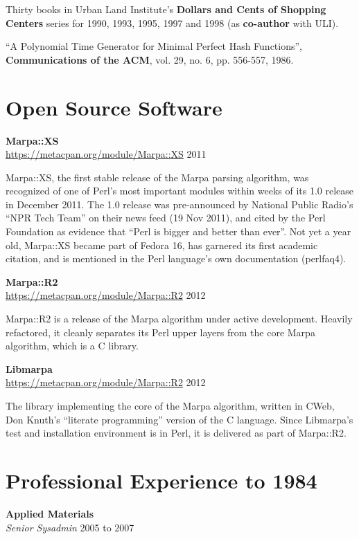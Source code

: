 \documentclass[12pt,margin,line]{res}
\newcommand{\internalskip}{\vspace{-.15in}}
\begin{document}
\begin{resume}
Thirty books in Urban Land Institute's 
{\bf Dollars and Cents of Shopping Centers}
series for 1990, 1993, 1995, 1997 and 1998
(as {\bf co-author}
with ULI).

``A Polynomial Time Generator for Minimal Perfect Hash Functions'',
{\bf Communications of the ACM},
vol.  29, no.  6, pp.  556-557, 1986.

\section{\sc Open Source Software}

{\bf Marpa::XS} \\
\url{https://metacpan.org/module/Marpa::XS} \hfill 2011

\internalskip
Marpa::XS, the first stable release of the Marpa parsing algorithm,
was recognized of one of Perl's most important modules
within weeks of its 1.0 release in December 2011.
The 1.0 release was
pre-announced by National Public Radio's ``NPR Tech Team'' on their
news feed (19 Nov 2011),
and cited by the Perl Foundation as evidence that
``Perl is bigger and better than ever''.
Not yet a year old,
Marpa::XS became part of Fedora 16,
has garnered its first academic citation,
and is mentioned in the Perl language's
own documentation (perlfaq4).

{\bf Marpa::R2} \\
\url{https://metacpan.org/module/Marpa::R2} \hfill 2012

\internalskip
Marpa::R2 is a release of the Marpa algorithm under active
development.
Heavily refactored,
it cleanly separates its Perl upper layers
from the core Marpa algorithm, which is a C library.

{\bf Libmarpa} \\
\url{https://metacpan.org/module/Marpa::R2} \hfill 2012

\internalskip
The library implementing the core of the Marpa algorithm,
written in CWeb, Don Knuth's ``literate programming'' version of 
the C language.
Since
Libmarpa's test and installation environment is in Perl,
it is delivered as part of Marpa::R2.

\section{\sc Professional Experience {\footnotesize to 1984}}

{\bf Applied Materials} \\
{\em Senior Sysadmin} \hfill 2005 to 2007


\end{resume}
\end{document}
